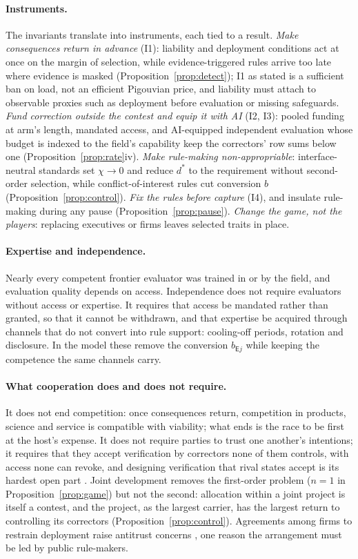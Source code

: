 \documentclass[letterpaper]{article} %
\theoremstyle{definition}
\newcommand{\dE}{\mathsf{E}}
\begin{document}
\paragraph{Instruments.} The invariants translate into instruments, each tied to a result. \emph{Make consequences return in advance} (I1): liability and deployment conditions act at once on the margin of selection, while evidence-triggered rules arrive too late where evidence is masked (Proposition~\ref{prop:detect}); I1 as stated is a sufficient ban on load, not an efficient Pigouvian price, and liability must attach to observable proxies such as deployment before evaluation or missing safeguards. \emph{Fund correction outside the contest and equip it with AI} (I2, I3): pooled funding at arm's length, mandated access, and AI-equipped independent evaluation whose budget is indexed to the field's capability keep the correctors' row sums below one (Proposition~\ref{prop:rate}iv). \emph{Make rule-making non-appropriable}: interface-neutral standards set $\chi\to0$ and reduce $d^\ast$ to the requirement without second-order selection, while conflict-of-interest rules cut conversion $b$ (Proposition~\ref{prop:control}). \emph{Fix the rules before capture} (I4), and insulate rule-making during any pause (Proposition~\ref{prop:pause}). \emph{Change the game, not the players}: replacing executives or firms leaves selected traits in place.

\paragraph{Expertise and independence.} Nearly every competent frontier evaluator was trained in or by the field, and evaluation quality depends on access. Independence does not require evaluators without access or expertise. It requires that access be mandated rather than granted, so that it cannot be withdrawn, and that expertise be acquired through channels that do not convert into rule support: cooling-off periods, rotation and disclosure. In the model these remove the conversion $b_{\dE j}$ while keeping the competence the same channels carry.

\paragraph{What cooperation does and does not require.} It does not end competition: once consequences return, competition in products, science and service is compatible with viability; what ends is the race to be first at the host's expense. It does not require parties to trust one another's intentions; it requires that they accept verification by correctors none of them controls, with access none can revoke, and designing verification that rival states accept is its hardest open part \citep{shavit2023,wasil2024}. Joint development removes the first-order problem ($n=1$ in Proposition~\ref{prop:game}) but not the second: allocation within a joint project is itself a contest, and the project, as the largest carrier, has the largest return to controlling its correctors (Proposition~\ref{prop:control}). Agreements among firms to restrain deployment raise antitrust concerns \citep{hua2021}, one reason the arrangement must be led by public rule-makers.
\end{document}

